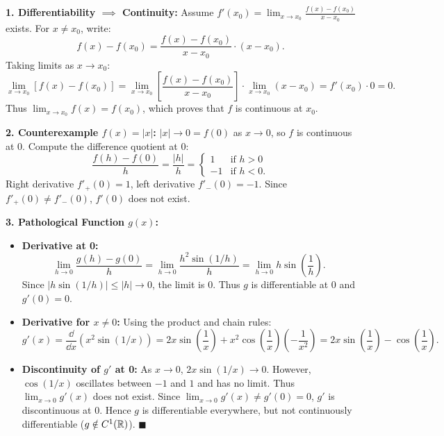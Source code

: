 \begin{solution}
\textbf{1. Differentiability $\implies$ Continuity:}
Assume $f'(x_0) = \lim_{x \to x_0} \frac{f(x) - f(x_0)}{x - x_0}$ exists.
For $x \ne x_0$, write:
\[
f(x) - f(x_0) = \frac{f(x) - f(x_0)}{x - x_0} \cdot (x - x_0).
\]
Taking limits as $x \to x_0$:
\[
\lim_{x \to x_0} [f(x) - f(x_0)] = \lim_{x \to x_0} \left[ \frac{f(x) - f(x_0)}{x - x_0} \right] \cdot \lim_{x \to x_0} (x - x_0) = f'(x_0) \cdot 0 = 0.
\]
Thus $\lim_{x \to x_0} f(x) = f(x_0)$, which proves that $f$ is continuous at $x_0$.

\textbf{2. Counterexample $f(x) = |x|$:}
$|x| \to 0 = f(0)$ as $x \to 0$, so $f$ is continuous at 0.
Compute the difference quotient at 0:
\[
\frac{f(h) - f(0)}{h} = \frac{|h|}{h} = \begin{cases} 1 & \text{if } h > 0 \\ -1 & \text{if } h < 0. \end{cases}
\]
Right derivative $f'_+(0) = 1$, left derivative $f'_-(0) = -1$.
Since $f'_+(0) \ne f'_-(0)$, $f'(0)$ does not exist.

\textbf{3. Pathological Function $g(x)$:}
\begin{itemize}[leftmargin=1.5em,itemsep=2pt]
  \item[(a)] \textbf{Derivative at 0:}
  \[
  \lim_{h \to 0} \frac{g(h) - g(0)}{h} = \lim_{h \to 0} \frac{h^2 \sin(1/h)}{h} = \lim_{h \to 0} h \sin\left(\frac{1}{h}\right).
  \]
  Since $|h \sin(1/h)| \le |h| \to 0$, the limit is $0$.
  Thus $g$ is differentiable at $0$ and $g'(0) = 0$.
  \item[(b)] \textbf{Derivative for $x \ne 0$:}
  Using the product and chain rules:
  \[
  g'(x) = \frac{\dd}{\dd x}\left(x^2 \sin(1/x)\right) = 2x \sin\left(\frac{1}{x}\right) + x^2 \cos\left(\frac{1}{x}\right)\left(-\frac{1}{x^2}\right) = 2x \sin\left(\frac{1}{x}\right) - \cos\left(\frac{1}{x}\right).
  \]
  \item[(c)] \textbf{Discontinuity of $g'$ at 0:}
  As $x \to 0$, $2x \sin(1/x) \to 0$. However, $\cos(1/x)$ oscillates between $-1$ and $1$ and has no limit.
  Thus $\lim_{x \to 0} g'(x)$ does not exist.
  Since $\lim_{x \to 0} g'(x) \ne g'(0) = 0$, $g'$ is discontinuous at $0$.
  Hence $g$ is differentiable everywhere, but not continuously differentiable ($g \notin C^1(\mathbb{R})$). \hfill $\blacksquare$
\end{itemize}
\end{solution}

